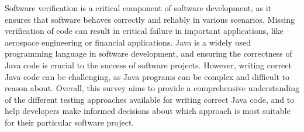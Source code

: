 Software verification is a critical component of software development, as it ensures that software behaves correctly and reliably in various scenarios. Missing verification of code can result in critical failure in important applications, like aerospace engineering or financial applications. Java is a widely used programming language in software development, and ensuring the correctness of Java code is crucial to the success of software projects. However, writing correct Java code can be challenging, as Java programs can be complex and difficult to reason about. Overall, this survey aims to provide a comprehensive understanding of the different testing approaches available for writing correct Java code, and to help developers make informed decisions about which approach is most suitable for their particular software project.